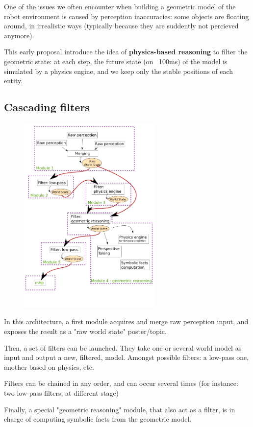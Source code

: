 \documentclass[a4paper]{article}
\begin{document}
One of the issues we often encounter when building a geometric model of the
robot environment is caused by perception inaccuracies: some objects are
floating around, in irrealistic ways (typically because they are suddently not
percieved anymore).

This early proposal introduce the idea of \textbf{physics-based reasoning} to
filter the geometric state: at each step, the future state (on ~100ms) of the
model is simulated by a physics engine, and we keep only the stable positions
of each entity.

\subsection{Cascading filters}

\begin{figure}[!h]
    \centering
    \includegraphics[height=10cm]{images/spark_archi1.png}
\end{figure}


In this architecture, a first module acquires and merge raw perception input,
and exposes the result as a "raw world state" poster/topic.

Then, a set of filters can be launched. They take one or several world model as
input and output a new, filtered, model. Amongst possible filters: a low-pass
one, another based on physics, etc.

Filters can be chained in any order, and can occur several times (for instance:
two low-pass filters, at different stage)

Finally, a special "geometric reasoning" module, that also act as a filter, is
in charge of computing symbolic facts from the geometric model.
\end{document}
